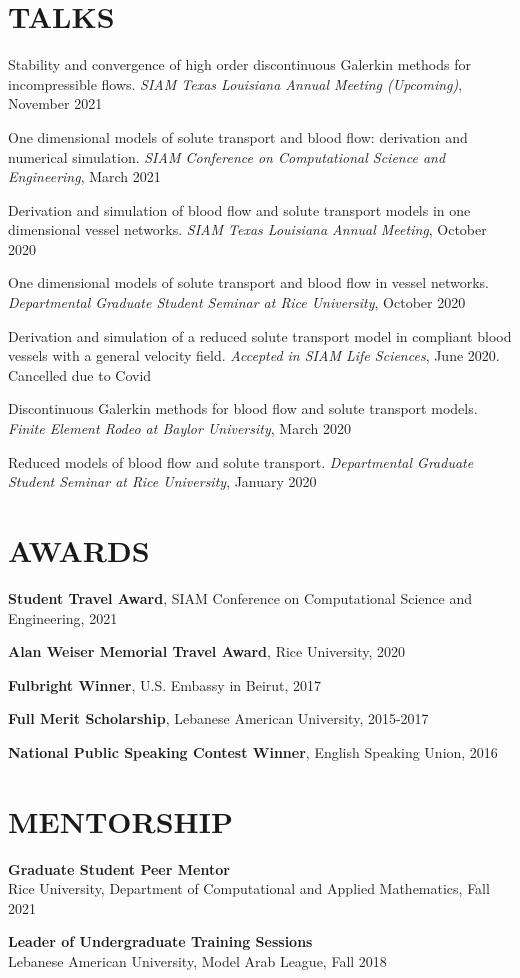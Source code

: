 \documentclass[margin]{res}
\begin{document}
\begin{resume}
\section{TALKS}
Stability and convergence of high order discontinuous Galerkin methods for incompressible flows. \textit{SIAM Texas Louisiana Annual Meeting (Upcoming)}, November 2021 
\par One dimensional models of solute transport and blood flow: derivation and numerical simulation. \textit{SIAM Conference on Computational Science and Engineering}, March  2021
\par Derivation and simulation of blood flow and solute transport models in one dimensional vessel networks.\textit{ SIAM Texas Louisiana Annual Meeting}, October 2020
\par One dimensional models of solute transport and blood flow in vessel networks. \textit{Departmental Graduate Student Seminar at Rice University}, October 2020
\par Derivation and simulation of a reduced solute transport model in compliant blood vessels with a general velocity field.  \textit{Accepted in SIAM Life Sciences}, June 2020. Cancelled due to Covid
\par 
Discontinuous Galerkin methods for blood flow and solute transport models.\textit{ Finite Element Rodeo at Baylor University}, March 2020
\par 
 Reduced models of blood flow and solute transport. \textit{Departmental Graduate Student Seminar at Rice University}, January 2020
\section{AWARDS}
\textbf{Student Travel Award}, SIAM Conference on Computational Science and Engineering, 2021 
\par
\textbf{Alan Weiser Memorial Travel Award}, Rice University, 2020
\par 
\textbf{Fulbright Winner}, U.S. Embassy in Beirut,  2017
\par
\textbf{Full Merit Scholarship}, Lebanese American University, 2015-2017  \par
\textbf{National Public Speaking Contest  Winner}, English Speaking Union, 2016 

\section{MENTORSHIP}
\textbf{Graduate Student Peer Mentor} \\
Rice University, Department of Computational and Applied Mathematics, Fall 2021  \par 
\textbf{Leader of Undergraduate Training Sessions}   \\ 
Lebanese American University, Model Arab League, Fall 2018    

\end{resume}
\end{document}
